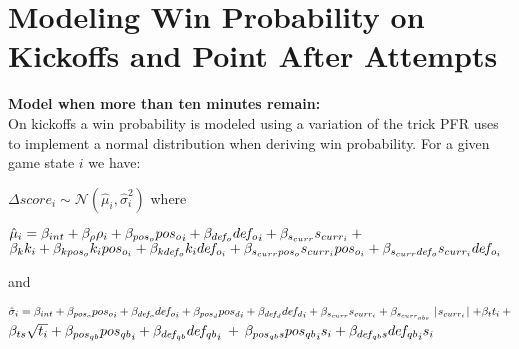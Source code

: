 \documentclass[12pt,twoside]{dukestatscithesis}
\begin{document}
\hypertarget{modeling-win-probability-on-kickoffs-and-point-after-attempts}{%
\section{Modeling Win Probability on Kickoffs and Point After Attempts}\label{modeling-win-probability-on-kickoffs-and-point-after-attempts}}

\textbf{Model when more than ten minutes remain:}\\
On kickoffs a win probability is modeled using a variation of the trick PFR uses to implement a normal distribution when deriving win probability. For a given game state \(i\) we have:

\(\Delta score_i \sim \mathcal{N}(\hat{\mu}_i,\hat{\sigma}^{2}_i)\) where

\(\hat{\mu}_i = \beta_{int} + \beta_\rho\rho_i + \beta_{pos_o}{pos_o}_i + \beta_{de\hspace{-0.1em}f_o}{de\hspace{-0.1em}f_o}_i + \beta_{s_{curr}}s_{curr_i}\:+\)\\
\(\beta_kk_i + \beta_{kpos_o}k_ipos_{o_i} + \beta_{k{de\hspace{-0.1em}f_o}}k_i{de\hspace{-0.1em}f_{o_i}} + \beta_{s_{curr}pos_o}s_{curr_i}pos_{o_i} + \beta_{s_{curr}{de\hspace{-0.1em}f_o}}s_{curr_i}{de\hspace{-0.1em}f_{o_i}}\)

and

\(\hat{\sigma}_i = \beta_{int} + \beta_{pos_o}{pos_o}_i + \beta_{de\hspace{-0.1em}f_o}{de\hspace{-0.1em}f_o}_i + \beta_{pos_d}{pos_d}_i + \beta_{de\hspace{-0.1em}f_d}{de\hspace{-0.1em}f_d}_i + \beta_{s_{curr}}s_{curr_i} + \beta_{s_{curr_{abs}}}\mid\hspace{-0.2em}{s_{curr_i}}\hspace{-0.2em}\mid + \beta_tt_i \: +\)\\
\(\beta_{ts}\sqrt{t_i} + \beta_{pos_{qb}}{pos_{qb}}_i + \beta_{de\hspace{-0.1em}f_{qb}}{de\hspace{-0.1em}f_{qb}}_i\) + \(\beta_{pos_{qb}s}{pos_{qb}}_is_i + \beta_{de\hspace{-0.1em}f_{qb}s}{de\hspace{-0.1em}f_{qb}}_is_i\)
\end{document}
